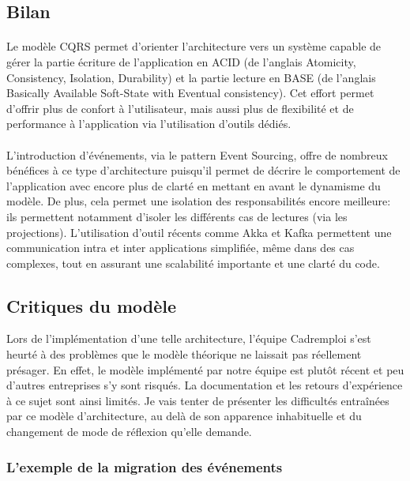 \subsection{Bilan}
\paragraph{}
Le modèle CQRS permet d'orienter l'architecture vers un système capable de gérer la partie écriture de l'application en ACID (de l'anglais Atomicity, Consistency, Isolation, Durability) et la partie lecture en BASE (de l'anglais Basically Available Soft-State with Eventual consistency).
Cet effort permet d'offrir plus de confort à l'utilisateur, mais aussi plus de flexibilité et de performance à l'application via l'utilisation d'outils dédiés.
\paragraph{}
L'introduction d'événements, via le pattern Event Sourcing, offre de nombreux bénéfices à ce type d'architecture puisqu'il permet de décrire le comportement de l'application avec encore plus de clarté en mettant en avant le dynamisme du modèle.
De plus, cela permet une isolation des responsabilités encore meilleure: ils permettent notamment d'isoler les différents cas de lectures (via les projections).
L'utilisation d'outil récents comme Akka et Kafka permettent une communication intra et inter applications simplifiée, même dans des cas complexes, tout en assurant une scalabilité importante et une clarté du code.

\subsection{Critiques du modèle}
Lors de l'implémentation d'une telle architecture, l'équipe Cadremploi s'est heurté à des problèmes que le modèle théorique ne laissait pas réellement présager.
En effet, le modèle implémenté par notre équipe est plutôt récent et peu d'autres entreprises s'y sont risqués.
La documentation et les retours d'expérience à ce sujet sont ainsi limités.
Je vais tenter de présenter les difficultés entraînées par ce modèle d'architecture, au delà de son apparence inhabituelle et du changement de mode de réflexion qu'elle demande.
\subsubsection{L'exemple de la migration des événements}
